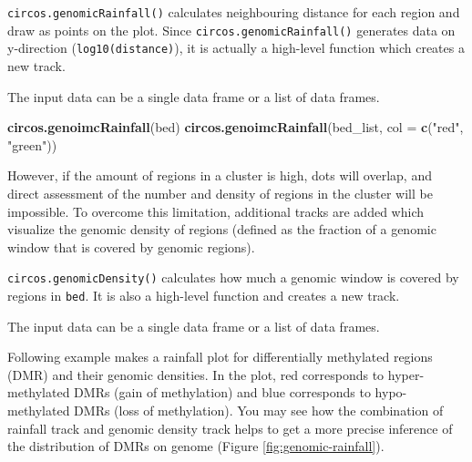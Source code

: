 \documentclass[]{book}
\newenvironment{Shaded}{\begin{snugshade}}{\end{snugshade}}
\newcommand{\KeywordTok}[1]{\textcolor[rgb]{0.13,0.29,0.53}{\textbf{#1}}}
\newcommand{\DataTypeTok}[1]{\textcolor[rgb]{0.13,0.29,0.53}{#1}}
\newcommand{\DecValTok}[1]{\textcolor[rgb]{0.00,0.00,0.81}{#1}}
\newcommand{\FloatTok}[1]{\textcolor[rgb]{0.00,0.00,0.81}{#1}}
\newcommand{\StringTok}[1]{\textcolor[rgb]{0.31,0.60,0.02}{#1}}
\newcommand{\NormalTok}[1]{#1}
\begin{document}
\texttt{circos.genomicRainfall()} calculates neighbouring distance for
each region and draw as points on the plot. Since
\texttt{circos.genomicRainfall()} generates data on y-direction
(\texttt{log10(distance)}), it is actually a high-level function which
creates a new track.

The input data can be a single data frame or a list of data frames.

\begin{Shaded}
\begin{Highlighting}[]
\KeywordTok{circos.genoimcRainfall}\NormalTok{(bed)}
\KeywordTok{circos.genoimcRainfall}\NormalTok{(bed_list, }\DataTypeTok{col =} \KeywordTok{c}\NormalTok{(}\StringTok{"red"}\NormalTok{, }\StringTok{"green"}\NormalTok{))}
\end{Highlighting}
\end{Shaded}

However, if the amount of regions in a cluster is high, dots will
overlap, and direct assessment of the number and density of regions in
the cluster will be impossible. To overcome this limitation, additional
tracks are added which visualize the genomic density of regions (defined
as the fraction of a genomic window that is covered by genomic regions).

\texttt{circos.genomicDensity()} calculates how much a genomic window is
covered by regions in \texttt{bed}. It is also a high-level function and
creates a new track.

The input data can be a single data frame or a list of data frames.

\begin{Shaded}
\end{Shaded}

Following example makes a rainfall plot for differentially methylated
regions (DMR) and their genomic densities. In the plot, red corresponds
to hyper-methylated DMRs (gain of methylation) and blue corresponds to
hypo-methylated DMRs (loss of methylation). You may see how the
combination of rainfall track and genomic density track helps to get a
more precise inference of the distribution of DMRs on genome (Figure
\ref{fig:genomic-rainfall}).
\end{document}
